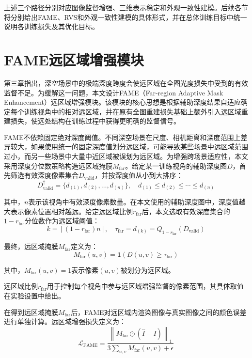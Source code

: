 上述三个路径分别对应图像监督增强、三维表示稳定和外观一致性建模。后续各节将分别给出FAME、RVS和外观一致性建模的具体形式，并在总体训练目标中统一说明各训练损失及其优化目标。

\section{FAME远区域增强模块}

第三章指出，深空场景中的极端深度跨度会使远区域在全图光度损失中受到的有效监督不足。为缓解这一问题，本文设计FAME（Far-region Adaptive Mask Enhancement）远区域增强模块。该模块的核心思想是根据辅助深度结果自适应确定每个训练视角中的相对远区域，并在原有全图重建损失基础上额外引入远区域重建损失，使远处结构在训练过程中获得更明确的监督信号。

FAME不依赖固定绝对深度阈值。不同深空场景在尺度、相机距离和深度范围上差异较大，如果使用统一的固定深度值划分远区域，可能导致某些场景中远区域范围过小，而另一些场景中大量中近区域被误划为远区域。为增强跨场景适应性，本文采用深度分位数策略构造远区域掩膜$M_{\mathrm{far}}$。给定某一训练视角的辅助深度图$D$，首先筛选有效深度像素集合$D_{\mathrm{valid}}$，并按深度值从小到大排序：
\begin{equation}
    D_{\mathrm{valid}}^{\uparrow}=\{d_{(1)},d_{(2)},\ldots,d_{(n)}\},\quad d_{(1)}\le d_{(2)}\le\cdots\le d_{(n)}
\end{equation}

其中，$n$表示该视角中有效深度像素数量。在本文使用的辅助深度图中，深度值越大表示像素位置相对越远。给定远区域比例$r_{\mathrm{far}}$后，本文选取有效深度集合的$1-r_{\mathrm{far}}$分位数作为远区域阈值：
\begin{equation}
    k=\left\lceil(1-r_{\mathrm{far}})n\right\rceil,\quad
    \tau_{\mathrm{far}}=d_{(k)}=Q_{1-r_{\mathrm{far}}}(D_{\mathrm{valid}})
\end{equation}

最终，远区域掩膜$M_{\mathrm{far}}$定义为：
\begin{equation}
    M_{\mathrm{far}}(u,v)=\mathbf{1}\left(D(u,v)\ge \tau_{\mathrm{far}}\right)
\end{equation}

其中，$M_{\mathrm{far}}(u,v)=1$表示像素$(u,v)$被划分为远区域。

远区域比例$r_{\mathrm{far}}$用于控制每个视角中参与远区域增强监督的像素范围，其具体取值在实验设置中给出。

在得到远区域掩膜$M_{\mathrm{far}}$后，FAME对远区域内渲染图像与真实图像之间的颜色误差进行单独计算。远区域增强损失定义为：
\begin{equation}
    \mathcal{L}_{\mathrm{FAME}}=\frac{\left\|M_{\mathrm{far}}\odot(\hat I-I)\right\|_1}{3\sum_{u,v}M_{\mathrm{far}}(u,v)+\epsilon}
\end{equation}

